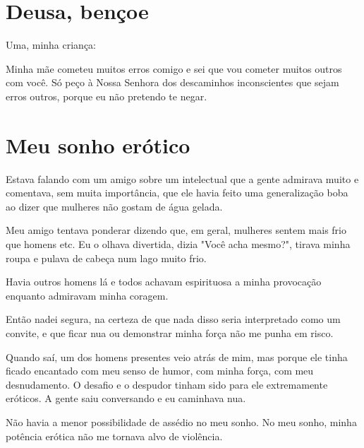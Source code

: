 \chapter{Deusa, bençoe}

Uma, minha criança:

Minha mãe cometeu muitos erros comigo e sei que vou cometer muitos
outros com você. Só peço à Nossa Senhora dos descaminhos inconscientes
que sejam erros outros, porque eu não pretendo te negar.

\chapter{Meu sonho erótico}

Estava falando com um amigo sobre um intelectual que a gente admirava
muito e comentava, sem muita importância, que ele havia feito uma
generalização boba ao dizer que mulheres não gostam de água gelada.

Meu amigo tentava ponderar dizendo que, em geral, mulheres sentem mais
frio que homens etc. Eu o olhava divertida, dizia "Você acha mesmo?",
tirava minha roupa e pulava de cabeça num lago muito frio.

Havia outros homens lá e todos achavam espirituosa a minha provocação
enquanto admiravam minha coragem.

Então nadei segura, na certeza de que nada disso seria interpretado como
um convite, e que ficar nua ou demonstrar minha força não me punha em
risco.

Quando saí, um dos homens presentes veio atrás de mim, mas porque ele
tinha ficado encantado com meu senso de humor, com minha força, com meu
desnudamento. O desafio e o despudor tinham sido para ele extremamente
eróticos. A gente saiu conversando e eu caminhava nua.

Não havia a menor possibilidade de assédio no meu sonho. No meu sonho,
minha potência erótica não me tornava alvo de violência.
